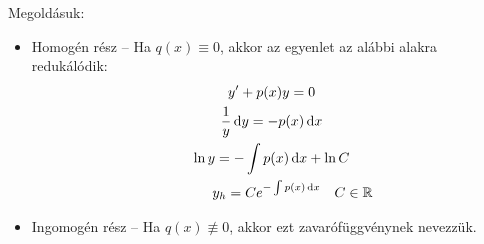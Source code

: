 \documentclass[main.tex]{subfiles}
\begin{document}
Megoldásuk:
\begin{itemize}
  \item Homogén rész
        \tabto{3cm} – \tabto{3.6cm}
        Ha $q(x) \equiv 0$,
        akkor az egyenlet az alábbi alakra redukálódik:
        \begin{gather*}
          y' + p(x)y = 0
          \\
          \frac{1}{y} \, \mathrm{d} y = -p(x) \, \mathrm{d} x
          \\
          \ln y = -\int p(x) \, \mathrm{d} x + \ln C
          \\
          \quad\quad\quad
          y_h = C e^{-\int p(x) \, \mathrm{d} x}
          \quad C \in \mathbb{R}
        \end{gather*}

  \item Ingomogén rész
        \tabto{3.1cm} – \tabto{3.6cm}
        Ha $q(x) \not\equiv 0$,
        akkor ezt zavarófüggvénynek nevezzük.


\end{itemize}
\end{document}
